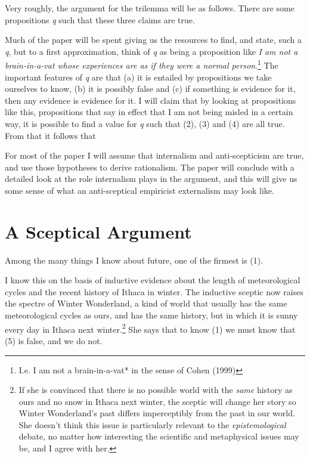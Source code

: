 Very roughly, the argument for the trilemma will be as follows. There are some propositions \textit{q} such that these three claims are true.


\noindent Much of the paper will be spent giving us the resources to find, and state, such a \textit{q}, but to a first approximation, think of \textit{q} as being a proposition like \textit{I am not a brain-in-a-vat whose experiences are as if they were a normal person}.\footnote{I.e. I am not a brain-in-a-vat* in the sense of Cohen (1999)} The important features of \textit{q} are that (a) it is entailed by propositions we take ourselves to know, (b) it is possibly false and (c) if something is evidence for it, then any evidence is evidence for it. I will claim that by looking at propositions like this, propositions that say in effect that I am not being misled in a certain way, it is possible to find a value for \textit{q} such that (2), (3) and (4) are all true. From that it follows that 

For most of the paper I will assume that internalism and anti-scepticism are true, and use those hypotheses to derive rationalism. The paper will conclude with a detailed look at the role internalism plays in the argument, and this will give us some sense of what an anti-sceptical empiricist externalism may look like.

\section{A Sceptical Argument}

Among the many things I know about future, one of the firmest is (1).


\noindent I know this on the basis of inductive evidence about the length of meteorological cycles and the recent history of Ithaca in winter. The inductive sceptic now raises the spectre of Winter Wonderland, a kind of world that usually has the same meteorological cycles as ours, and has the same history, but in which it is sunny every day in Ithaca next winter.\footnote{If she is convinced that there is no possible world with the \textit{same} history as ours and no snow in Ithaca next winter, the sceptic will change her story so Winter Wonderland's past differs imperceptibly from the past in our world. She doesn't think this issue is particularly relevant to the \textit{epistemological} debate, no matter how interesting the scientific and metaphysical issues may be, and I agree with her.} She says that to know (1) we must know that (5) is false, and we do not.

